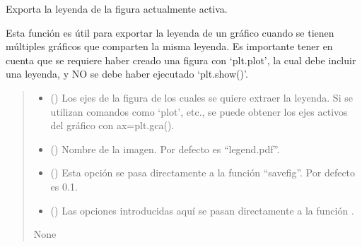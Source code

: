 \documentclass[letterpaper,10pt,english]{sphinxmanual}
\begin{document}
\begin{fulllineitems}
\label{\detokenize{myutils:myutils.export_legend_plt}}
\pysigstartsignatures
{}
\pysigstopsignatures
\sphinxAtStartPar
Exporta la leyenda de la figura actualmente activa.

\sphinxAtStartPar
Esta función es útil para exportar la leyenda de un gráfico cuando se tienen
múltiples gráficos que comparten la misma leyenda. Es importante tener en cuenta
que se requiere haber creado una figura con ‘plt.plot’, la cual debe incluir una
leyenda, y NO se debe haber ejecutado ‘plt.show()’.
\begin{quote}\begin{description}
\begin{itemize}
\item {} 
\sphinxAtStartPar
{} () \textendash{} Los ejes de la figura de los cuales se quiere extraer la leyenda. Si se utilizan
comandos como ‘plot’, etc., se puede obtener los ejes activos del gráfico con
ax=plt.gca().

\item {} 
\sphinxAtStartPar
{} (\sphinxstyleliteralemphasis{\sphinxupquote{, }}) \textendash{} Nombre de la imagen. Por defecto es “legend.pdf”.

\item {} 
\sphinxAtStartPar
{} (\sphinxstyleliteralemphasis{\sphinxupquote{, }}) \textendash{} Esta opción se pasa directamente a la función “savefig”. Por defecto es 0.1.

\item {} 
\sphinxAtStartPar
{} () \textendash{} Las opciones introducidas aquí se pasan directamente a la función .

\end{itemize}

\sphinxAtStartPar
None

\end{description}\end{quote}

\end{fulllineitems}
\end{document}
